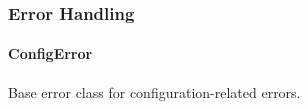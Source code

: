 \begin{Shaded}
\begin{Highlighting}[]
\OperatorTok{:} \OperatorTok{;}
 \OperatorTok{;}
\OperatorTok{:} \NormalTok{) }\KeywordTok{=\textgreater{}} \OperatorTok{;}
\NormalTok{\}}
\end{Highlighting}
\end{Shaded}

\hypertarget{error-handling-3}{%
\subsubsection{Error Handling}\label{error-handling-3}}

\hypertarget{configerror-1}{%
\paragraph{ConfigError}\label{configerror-1}}

Base error class for configuration-related errors.


